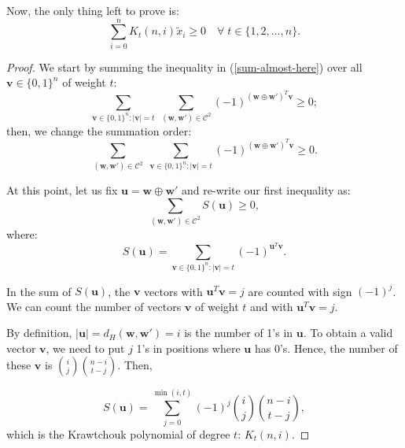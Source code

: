 \begin{lemma}
    Now, the only thing left to prove is:
    \begin{equation*}
        \sum\limits_{i=0}^{n}K_t(n,i)\tilde{x}_i\geq 0 \quad\forall\; t\in\{1,2,\ldots,n\}.
    \end{equation*}

    \begin{proof}
        We start by summing the inequality in (\ref{sum-almost-here}) over all $\mathbf{v}\in \{0,1\}^n$ of weight $t$:
        \begin{equation*}
            \sum_{\mathbf{v}\in \{0,1\}^n:|\mathbf{v}|=t}\;\sum_{(\mathbf{w}, \mathbf{w}')\in\mathcal{C}^2}(-1)^{(\textbf{w} \oplus \textbf{w}')^T\mathbf{v}} \geq 0;
        \end{equation*}
        then, we change the summation order:
        \begin{equation*}
            \sum_{(\mathbf{w}, \mathbf{w}')\in\mathcal{C}^2}\;\sum_{\mathbf{v}\in \{0,1\}^n:|\mathbf{v}|=t}(-1)^{(\textbf{w} \oplus \textbf{w}')^T\mathbf{v}} \geq 0.
        \end{equation*}

        At this point, let us fix $\mathbf{u} = \textbf{w} \oplus \textbf{w}'$ and re-write our first inequality as:
        \begin{equation}
            \label{s-u-inequality}
            \sum_{(\mathbf{w}, \mathbf{w}')\in\mathcal{C}^2}S(\mathbf{u}) \geq 0,
        \end{equation}
        where:
        \begin{equation*}
            S(\mathbf{u})=\sum_{\mathbf{v}\in \{0,1\}^n:|\mathbf{v}|=t}(-1)^{\mathbf{u}^T\mathbf{v}}.
        \end{equation*}
        

        In the sum of $S(\mathbf{u})$, the $\mathbf{v}$ vectors with $\mathbf{u}^T\mathbf{v}=j$ are counted with sign $(-1)^j$. We can count the number of vectors $\mathbf{v}$ of weight $t$ and with $\mathbf{u}^T\mathbf{v}=j$.

        By definition, $|\mathbf{u}|=d_H(\mathbf{w}, \mathbf{w}') = i$ is the number of 1's in $\mathbf{u}$. To obtain a valid vector $\mathbf{v}$, we need to put $j$ 1's in positions where $\mathbf{u}$ has 0's.
        Hence, the number of these $\mathbf{v}$ is ${i \choose j}{n-i \choose t-j}$. Then,

        \begin{equation*}
            S(\mathbf{u})=\sum_{j=0}^{\min(i,t)}(-1)^j{i \choose j}{n-i \choose t-j},
        \end{equation*}
        which is the Krawtchouk polynomial of degree $t$: $K_t(n,i)$.
        

\end{proof}
\end{lemma}
